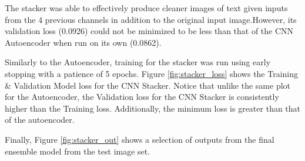 \documentclass[10pt,twocolumn,letterpaper]{article}
\begin{document}
The stacker was able to effectively produce cleaner images of text given inputs from the 4 previous channels in addition to the original input image.However, its validation loss (0.0926) could not be minimized to be less than that of the CNN Autoencoder when run on its own (0.0862).

Similarly to the Autoencoder, training for the stacker was run using early stopping with a patience of 5 epochs. Figure \ref{fig:stacker_loss} shows the Training \& Validation Model loss for the CNN Stacker. Notice that unlike the same plot for the Autoencoder, the Validation loss for the CNN Stacker is consistently higher than the Training loss. Additionally, the minimum loss is greater than that of the autoencoder.

Finally, Figure \ref{fig:stacker_out} shows a selection of outputs from the final ensemble model from the test image set.
\end{document}
